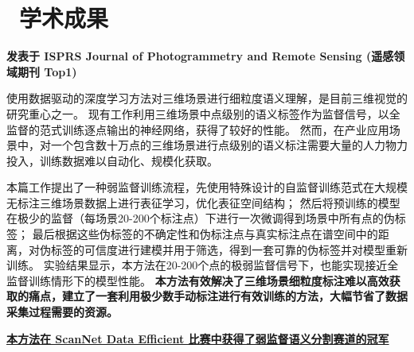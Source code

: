 \documentclass{resume}
\begin{document}
\section{\faGraduationCap\ 学术成果}


\begin{spacing}{1.2}
  \textbf{发表于 ISPRS Journal of Photogrammetry and Remote Sensing (遥感领域期刊 Top1)}
  
  \vspace{0.5em}
  使用数据驱动的深度学习方法对三维场景进行细粒度语义理解，是目前三维视觉的研究重心之一。
  现有工作利用三维场景中点级别的语义标签作为监督信号，以全监督的范式训练逐点输出的神经网络，获得了较好的性能。
  然而，在产业应用场景中，对一个包含数十万点的三维场景进行点级别的语义标注需要大量的人力物力投入，训练数据难以自动化、规模化获取。
  
  \vspace{0.5em}
  本篇工作提出了一种弱监督训练流程，先使用特殊设计的自监督训练范式在大规模无标注三维场景数据上进行表征学习，优化表征空间结构；
  然后将预训练的模型在极少的监督（每场景20-200个标注点）下进行一次微调得到场景中所有点的伪标签；
  最后根据这些伪标签的不确定性和伪标注点与真实标注点在谱空间中的距离，对伪标签的可信度进行建模并用于筛选，得到一套可靠的伪标签并对模型重新训练。
  实验结果显示，本方法在20-200个点的极弱监督信号下，也能实现接近全监督训练情形下的模型性能。
  \textbf{本方法有效解决了三维场景细粒度标注难以高效获取的痛点，建立了一套利用极少数手动标注进行有效训练的方法，大幅节省了数据采集过程需要的资源。}

  \vspace{0.5em}
  \textbf{\underline{本方法在 ScanNet Data Efficient 比赛中获得了弱监督语义分割赛道的冠军\faTrophy}}

\end{spacing}
\end{document}
